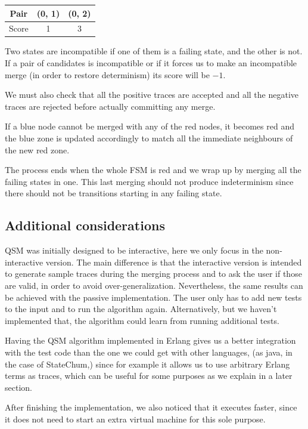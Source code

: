 \documentclass[]{sigplanconf}
\begin{document}
\begin{center}
\begin{tabular}{c||c|c}
Pair & (0, 1) & (0, 2)\\\hline\hline
Score & 1 & 3
\end{tabular}
\end{center}

Two states are incompatible if one of them is a failing state, and
the other is not. If a pair of candidates is incompatible or if
it forces us to make an incompatible merge (in order to restore determinism)
its score will be $-1$.

We must also check that all the positive traces are accepted and
all the negative traces are rejected before actually committing
any merge.

If a blue node cannot be merged with any of the red nodes,
it becomes red and the blue zone is updated accordingly to
match all the immediate neighbours of the new red zone.

The process ends when the whole FSM is red and we wrap up by
merging all the failing states in one. This last merging should
not produce indeterminism since there should not be transitions
starting in any failing state.

\subsection{Additional considerations}

QSM was initially designed to be interactive, here we only
focus in the non-interactive version. The main difference is that the interactive
version is intended to generate sample traces during the merging process and to ask
the user if those are valid, in order to avoid over-generalization.
Nevertheless, the same results can be achieved with the passive
implementation. The user only has to add new tests to the input
and to run the algorithm again. Alternatively, but we haven't implemented that,
the algorithm could learn from running additional tests.

Having the QSM algorithm implemented in Erlang
gives us a better integration with the test code than the one we could
get with other languages, (as java, in the case of StateChum,) since for
example it allows us to use arbitrary Erlang terms as traces, which can
be useful for some purposes as we explain in a later section.

After finishing the implementation, we also noticed that it executes
faster, since it does not need to start an extra virtual machine for this sole purpose.
\end{document}
